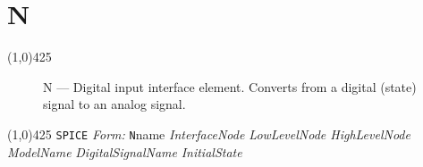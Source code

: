 
\oddsidemargin 10mm \topmargin 0.0in \textwidth 5.5in \textheight
7.375in \evensidemargin 1.0in \headheight 0.18in \footskip 0.16in
%
\section[N \- Digital Input Interface]{ \hspace{70mm}\huge\textbf{N}}
\linethickness{1mm}
\line(1,0){425}
\normalsize
\begin{figure}[h]
\centerline{\epsfxsize=2in} \caption{N ---
Digital input interface element. Converts from a digital (state)
signal to an analog signal.}
\end{figure}
\newline
\linethickness{0.5mm} \line(1,0){425}
\newline
\texttt{SPICE} \textit{Form:}
\newline
{\tt N}name {\it InterfaceNode LowLevelNode HighLevelNode
ModelName}
   {\it DigitalSignalName} \E
   {\it InitialState} \E
\newline
\newline

